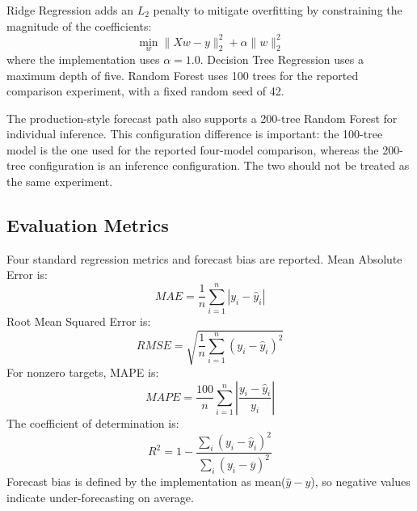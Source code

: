\documentclass[9pt,conference]{IEEEtran}
\providecommand{\syscite}[1]{}
\begin{document}
Ridge Regression adds an $L_{2}$ penalty to mitigate overfitting by constraining the magnitude of the coefficients: \syscite{[cite: 1]}
\begin{equation}
\min_{w} \| Xw - y \|_{2}^{2} + \alpha \| w \|_{2}^{2}
\end{equation}
where the implementation uses $\alpha=1.0$. \syscite{[cite: 1]} Decision Tree Regression uses a maximum depth of five. \syscite{[cite: 1]} Random Forest uses 100 trees for the reported comparison experiment, with a fixed random seed of 42. \syscite{[cite: 1]} 

The production-style forecast path also supports a 200-tree Random Forest for individual inference. \syscite{[cite: 1]} This configuration difference is important: the 100-tree model is the one used for the reported four-model comparison, whereas the 200-tree configuration is an inference configuration. \syscite{[cite: 1]} The two should not be treated as the same experiment. \syscite{[cite: 1]}

\subsection{Evaluation Metrics}
Four standard regression metrics and forecast bias are reported. \syscite{[cite: 1]} Mean Absolute Error is: \syscite{[cite: 1]}
\begin{equation}
MAE = \frac{1}{n}\sum_{i=1}^{n}|y_{i}-\hat{y}_{i}|
\end{equation}
Root Mean Squared Error is: \syscite{[cite: 1]}
\begin{equation}
RMSE = \sqrt{\frac{1}{n}\sum_{i=1}^{n}(y_{i}-\hat{y}_{i})^{2}}
\end{equation}
For nonzero targets, MAPE is: \syscite{[cite: 1]}
\begin{equation}
MAPE = \frac{100}{n}\sum_{i=1}^{n}\left|\frac{y_{i}-\hat{y}_{i}}{y_{i}}\right|
\end{equation}
The coefficient of determination is: \syscite{[cite: 1]}
\begin{equation}
R^{2} = 1-\frac{\sum_{i}(y_{i}-\hat{y}_{i})^{2}}{\sum_{i}(y_{i}-\overline{y})^{2}}
\end{equation}
Forecast bias is defined by the implementation as mean($\hat{y}-y$), so negative values indicate under-forecasting on average. \syscite{[cite: 1]}
\end{document}
